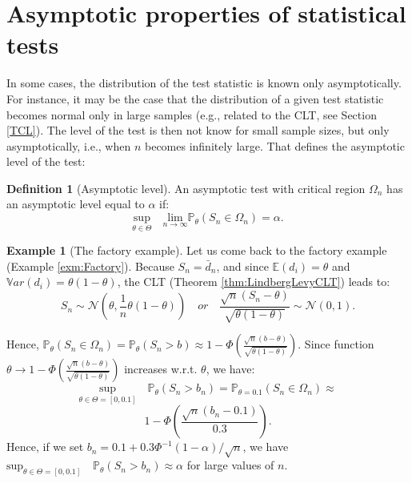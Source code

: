 \documentclass[
  12pt,
]{book}
\theoremstyle{definition}
\newtheorem{definition}{Definition}[chapter]
\theoremstyle{definition}
\newtheorem{example}{Example}[chapter]
\theoremstyle{definition}
\theoremstyle{definition}
\theoremstyle{remark}
\begin{document}
\hypertarget{asymptotic-properties-of-statistical-tests}{%
\section{Asymptotic properties of statistical tests}\label{asymptotic-properties-of-statistical-tests}}

In some cases, the distribution of the test statistic is known only asymptotically. For instance, it may be the case that the distribution of a given test statistic becomes normal only in large samples (e.g., related to the CLT, see Section \ref{TCL}). The level of the test is then not know for small sample sizes, but only asymptotically, i.e., when \(n\) becomes infinitely large. That defines the asymptotic level of the test:

\begin{definition}[Asymptotic level]
\protect\hypertarget{def:asmyptlevel}{}\label{def:asmyptlevel}An asymptotic test with critical region \(\Omega_n\) has an asymptotic level equal to \(\alpha\) if:
\[
\underset{\theta \in \Theta}{\mbox{sup}} \quad \underset{n \rightarrow \infty}{\mbox{lim}} \mathbb{P}_\theta (S_n \in \Omega_n) = \alpha.
\]
\end{definition}

\begin{example}[The factory example]
\protect\hypertarget{exm:FactAsymptlevel}{}\label{exm:FactAsymptlevel}Let us come back to the factory example (Example \ref{exm:Factory}). Because \(S_n =\bar{d}_n\), and since \(\mathbb{E}(d_i)=\theta\) and \(\mathbb{V}ar(d_i)=\theta(1-\theta)\), the CLT (Theorem \ref{thm:LindbergLevyCLT}) leads to:
\[
S_n \sim \mathcal{N}\left(\theta,\frac{1}{n}\theta(1-\theta)\right) \quad or \quad \frac{\sqrt{n}(S_n-\theta)}{\sqrt{\theta(1-\theta)}} \sim \mathcal{N}(0,1).
\]

Hence, \(\mathbb{P}_\theta (S_n \in \Omega_n)=\mathbb{P}_\theta (S_n > b) \approx 1-\Phi\left(\frac{\sqrt{n}(b-\theta)}{\sqrt{\theta(1-\theta)}}\right)\). Since function \(\theta \rightarrow 1-\Phi\left(\frac{\sqrt{n}(b-\theta)}{\sqrt{\theta(1-\theta)}}\right)\) increases w.r.t. \(\theta\), we have:
\[
\underset{\theta \in \Theta=[0,0.1]}{\mbox{sup}} \quad \mathbb{P}_\theta (S_n > b_n) = \mathbb{P}_{\theta=0.1} (S_n \in \Omega_n)\approx\]
\[
1-\Phi\left(\frac{\sqrt{n}(b_n-0.1)}{0.3}\right).
\]
Hence, if we set \(b_n = 0.1 + 0.3\Phi^{-1}(1-\alpha)/\sqrt{n}\), we have \({\mbox{sup}}_{\theta \in \Theta=[0,0.1]} \quad \mathbb{P}_\theta (S_n > b_n) \approx \alpha\) for large values of \(n\).
\end{example}
\end{document}
